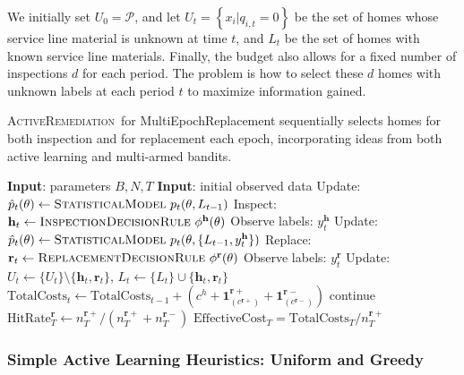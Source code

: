 \documentclass[sigconf]{acmart}
\newcommand{\inspect}{\mathbf{h}}
\newcommand{\replace}{\mathbf{r}}
\newcommand{\pool}{\mathcal{P}}
\def\statmodel{\textsc{StatisticalModel}\xspace}
\def\druleHVI{\textsc{InspectionDecisionRule}\xspace}
\def\druleSLR{\textsc{ReplacementDecisionRule}\xspace}
\def\activerem{\textsc{ActiveRemediation}\xspace}
\begin{document}
We initially set $U_0 = \pool$, and let $U_t = \left\{ x_i | q_{i,t} = 0 \right\}$ be the set of homes whose service line material is unknown at time $t$, and $L_t$ be the set of homes with known service line materials.  Finally, the budget also allows for a fixed number of inspections $d$ for each period. The problem is how to select these $d$ homes with unknown labels at each period $t$ to maximize information gained.




\begin{algorithm}
\caption{\activerem\ for MultiEpochReplacement sequentially selects homes for both inspection and for replacement each epoch, incorporating ideas from both active learning and multi-armed bandits.}\label{alg:al_mab}
\footnotesize{
\begin{algorithmic}[1]
\State \textbf{Input}: parameters $B,N,T$
\State \textbf{Input}: initial observed data
  \State Update: $\hat{p}_t(\theta)
    \gets \statmodel\ p_t(\theta, L_{t-1})$
  \State Inspect:
    $\inspect_t \gets\druleHVI\ \phi^{\inspect} (\theta)$
  \State Observe labels: $y_t^{\inspect}$
  \State Update: $\hat{p}_t(\theta)
    \gets \statmodel\ p_t(\theta, \{ L_{t-1}, y_t^{\inspect} \} )$
  \State Replace:
    $\replace_t \gets\druleSLR\ \phi^{\replace} (\theta)$
  \State Observe labels: $y_t^{\replace}$
  \State Update: $U_t \gets \{U_t \} \setminus \{ \inspect_t,\replace_t \}$,  $L_t \gets \{L_t \} \cup \{\inspect_t, \replace_t \}$
  \State $\text{TotalCosts}_t \gets \text{TotalCosts}_{t-1} + ( c^h + \mathbf{1}^{\replace+}_{(c^{\replace+})} + \mathbf{1}^{\replace-}_{( c^{\replace-} )} ) $
 continue 
\EndIf
\EndFor
 \State $\text{HitRate}_T^{\replace} \gets n_{T}^{\replace+} / (n_{T}^{\replace+} + n_{T}^{\replace-})$
\State $\text{EffectiveCost}_T = \text{TotalCosts}_T / n_{T}^{\replace+}$
\end{algorithmic}
}
\end{algorithm}



\subsubsection{Simple Active Learning Heuristics: Uniform and Greedy}
\end{document}
